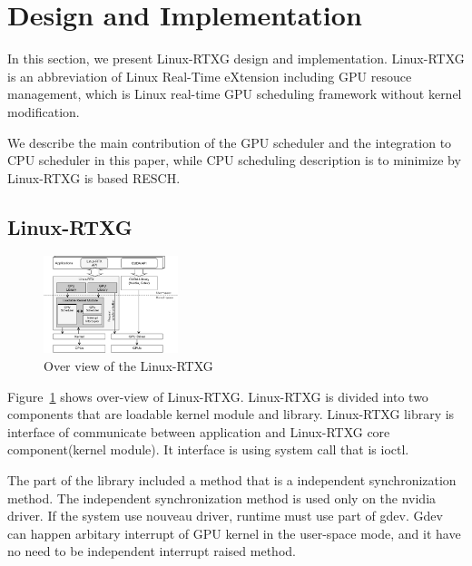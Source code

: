 \section{Design and Implementation}\label{sec:design_imple}
In this section, we present Linux-RTXG design and implementation.
Linux-RTXG is an abbreviation of Linux Real-Time eXtension including GPU resouce management,
which is Linux real-time GPU scheduling framework without kernel modification.

We describe the main contribution of the GPU scheduler and the integration to CPU scheduler in this paper,
while CPU scheduling description is to minimize by Linux-RTXG is based RESCH.


\subsection{Linux-RTXG}
\begin{figure}[t]
\begin{center}
\includegraphics[width=0.35\textwidth]{img/overview.pdf}
\caption{Over view of the Linux-RTXG}
\end{center}
\label{fig:overview}
\end{figure}

Figure~\ref{fig:overview} shows over-view of Linux-RTXG.
Linux-RTXG is divided into two components that are loadable kernel module and library.
Linux-RTXG library is interface of communicate between application and Linux-RTXG core component(kernel module).
It interface is using system call that is ioctl.

The part of the library included a method that is a independent synchronization method.
The independent synchronization method is used only on the nvidia driver.
If the system use nouveau driver, runtime must use part of gdev.
Gdev can happen arbitary interrupt of GPU kernel in the user-space mode, and it have no need to be independent interrupt raised method.

